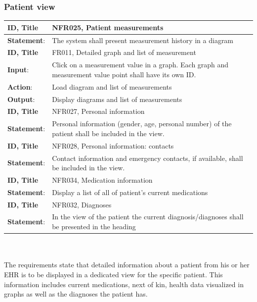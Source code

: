 \documentclass{article}
\begin{document}
\subsubsection{Patient view}
\begin{tabularx}{\linewidth}{| l |  X |}
\hline
\textbf{ID, Title} & NFR025, Patient measurements \\ 
\hline
\textbf{Statement}: & The system shall present measurement history in a diagram \\
\hline

\textbf{ID, Title} & FR011, Detailed graph and list of measurement \\ 
\hline
\textbf{Input}: & Click on a measurement value in a graph. Each graph and measurement value point shall have its own ID. \\
\textbf{Action}: & Load diagram and list of measurements \\
\textbf{Output}: & Display diagrams and list of measurements \\
\hline


\textbf{ID, Title} & NFR027, Personal information \\ 
\hline
\textbf{Statement}: & Personal information (gender, age, personal number) of the
patient shall be included in the view. \\
\hline

\textbf{ID, Title} & NFR028, Personal information: contacts \\ 
\hline
\textbf{Statement}: & Contact information and emergency contacts, if available, shall
be included in the view. \\
\hline

\textbf{ID, Title} & NFR034, Medication information \\ 
\hline
\textbf{Statement}: & Display a list of all of patient’s current medications \\
\hline

\textbf{ID, Title} & NFR032, Diagnoses \\ 
\hline
\textbf{Statement}: & In the view of the patient the current diagnosis/diagnoses shall
be presented in the heading \\
\hline
\end{tabularx}
\\ \\
The requirements state that detailed information about a patient from his or her EHR is to be displayed in a dedicated view for the specific patient. This information includes current medications, next of kin, health data visualized in graphs as well as the diagnoses the patient has.
\end{document}
